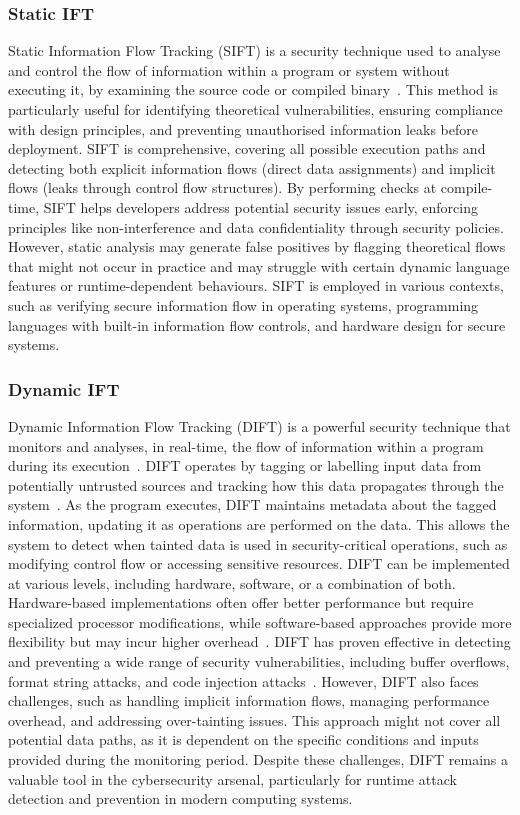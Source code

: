\subsubsection{Static IFT}
Static Information Flow Tracking (SIFT) is a security technique used to analyse and control the flow of information within a program or system without executing it, by examining the source code or compiled binary~\cite{HAK-21-acmcsur}. This method is particularly useful for identifying theoretical vulnerabilities, ensuring compliance with design principles, and preventing unauthorised information leaks before deployment. SIFT is comprehensive, covering all possible execution paths and detecting both explicit information flows (direct data assignments) and implicit flows (leaks through control flow structures). By performing checks at compile-time, SIFT helps developers address potential security issues early, enforcing principles like non-interference and data confidentiality through security policies. However, static analysis may generate false positives by flagging theoretical flows that might not occur in practice and may struggle with certain dynamic language features or runtime-dependent behaviours. SIFT is employed in various contexts, such as verifying secure information flow in operating systems, programming languages with built-in information flow controls, and hardware design for secure systems.

\subsubsection{Dynamic IFT}
Dynamic Information Flow Tracking (DIFT) is a powerful security technique that monitors and analyses, in real-time, the flow of information within a program during its execution~\cite{CGDJ-21-micromac}. DIFT operates by tagging or labelling input data from potentially untrusted sources and tracking how this data propagates through the system~\cite{SLD-04-sigplan}. As the program executes, DIFT maintains metadata about the tagged information, updating it as operations are performed on the data. This allows the system to detect when tainted data is used in security-critical operations, such as modifying control flow or accessing sensitive resources. DIFT can be implemented at various levels, including hardware, software, or a combination of both. Hardware-based implementations often offer better performance but require specialized processor modifications, while software-based approaches provide more flexibility but may incur higher overhead~\cite{CGDJ-21-micromac}. DIFT has proven effective in detecting and preventing a wide range of security vulnerabilities, including buffer overflows, format string attacks, and code injection attacks~\cite{SLD-04-sigplan}. However, DIFT also faces challenges, such as handling implicit information flows, managing performance overhead, and addressing over-tainting issues.
This approach might not cover all potential data paths, as it is dependent on the specific conditions and inputs provided during the monitoring period.
Despite these challenges, DIFT remains a valuable tool in the cybersecurity arsenal, particularly for runtime attack detection and prevention in modern computing systems.

